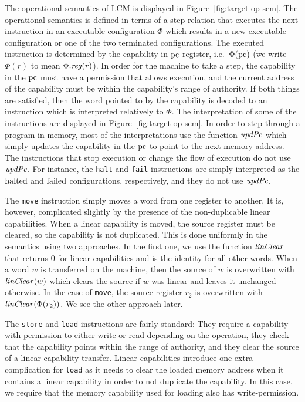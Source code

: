 \documentclass[acmsmall,review,anonymous]{acmart}\settopmatter{printfolios=true,printccs=false,printacmref=false}
\renewcommand{\updPcAddr}[1]{\plainfun{updPc}{#1}}
\renewcommand{\linCons}[1]{\plainfun{linClear}{#1}}
\newcommand{\trgcm}{\textsc{LCM}}
\begin{document}
The operational semantics of \trgcm{} is displayed in Figure~\ref{fig:target-op-sem}.
The operational semantics is defined in terms of a step relation that executes the next instruction in an executable configuration $\Phi$ which results in a new executable configuration or one of the two terminated configurations.
The executed instruction is determined by the capability in $\mathrm{pc}$ register, i.e.\ $\Phi(\mathrm{pc})$ (we write $\Phi(r)$ to mean $\Phi.\reg(r)$).
In order for the machine to take a step, the capability in the $\mathrm{pc}$ must have a permission that allows execution, and the current address of the capability must be within the capability's range of authority.
If both things are satisfied, then the word pointed to by the capability is decoded to an instruction which is interpreted relatively to $\Phi$.
The interpretation of some of the instructions are displayed in Figure~\ref{fig:target-op-sem}.
In order to step through a program in memory, most of the interpretations use the function $\updPcAddr{}$ which simply updates the capability in the $\mathrm{pc}$ to point to the next memory address.
The instructions that stop execution or change the flow of execution do not use $\updPcAddr{}$.
For instance, the \texttt{halt} and \texttt{fail} instructions are simply interpreted as the $\mathrm{halted}$ and $\mathrm{failed}$ configurations, respectively, and they do not use $\updPcAddr{}$.

The \texttt{move} instruction simply moves a word from one register to another.
It is, however, complicated slightly by the presence of the non-duplicable linear capabilities.
When a linear capability is moved, the source register must be cleared, so the capability is not duplicated.
This is done uniformly in the semantics using two approaches.
In the first one, we use the function $\linCons{}$ that returns $0$ for linear capabilities and is the identity for all other words.
When a word $w$ is transferred on the machine, then the source of $w$ is overwritten with $\linCons{w}$ which clears the source if $w$ was linear and leaves it unchanged otherwise.
In the case of \texttt{move}, the source register $r_2$ is overwritten with $\linCons{\Phi(r_2)}$.
We see the other approach later.

The \texttt{store} and \texttt{load} instructions are fairly standard: They require a capability with permission to either write or read depending on the operation, they check that the capability points within the range of authority, and they clear the source of a linear capability transfer.
Linear capabilities introduce one extra complication for \texttt{load} as it needs to clear the loaded memory address when it contains a linear capability in order to not duplicate the capability.
In this case, we require that the memory capability used for loading also has write-permission.
\end{document}
